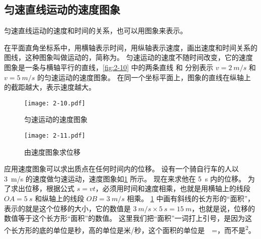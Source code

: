 \subsection{匀速直线运动的速度图象} 

匀速直线运动的速度和时间的关系，也可以用图象来表示。

在平面直角坐标系中，用横轴表示时间，用纵轴表示速度，画出速度和时间关系的图线，这种图象叫做运动的，简称为。
匀速运动的速度不随时间改变，它的速度图象是一条与横轴平行的直线，\cref{fig:2-10} 中的两条直线  和  分别表示 $v=\qty{2}{m/s}$ 和 $v=\qty{5}{m/s}$ 的匀速运动的速度图象。
在同一个坐标平面上，图象的直线在纵轴上的截距越大，表示速度越大。
\begin{figure}
  \begin{minipage}[b]{0.48\linewidth}
    \centering
    \texttt{[image: 2-10.pdf]}
    \caption{匀速运动的速度图象}\label{fig:2-10}
  \end{minipage}
  \begin{minipage}[b]{0.48\linewidth}
    \centering
    \texttt{[image: 2-11.pdf]}
    \caption{由速度图象求位移}\label{fig:2-11}
  \end{minipage}
\end{figure}

应用速度图象可以求出质点在任何时间内的位移。
设有一个骑自行车的人以 \qty{3}{m/s} 的速度做匀速运动，速度图象如\cref{fig:2-11} 所示。
现在来求他在 \qty{5}{s} 内的位移。
为了求出位移，根据公式 $s=vt$，必须用时间和速度相乘，也就是用横轴上的线段 $OA=\qty{5}{s}$ 和纵轴上的线段 $OB=\qty{3}{m/s}$ 相乘。
\cref{fig:2-11} 中画有斜线的长方形的“面积”，表示的就是这个位移的大小，它的数值是 $\qty{3}{m/s}\times\qty{5}{s}=\qty{15}{m}$，也就是说，位移的数值等于这个长方形“面积”的数值。
这里我们把“面积”一词打上引号，是因为这个长方形的底的单位是秒，高的单位是米/秒，这个面积的单位是\unit{\cdot{}}=\unit{}，而不是\unit{^2}。

